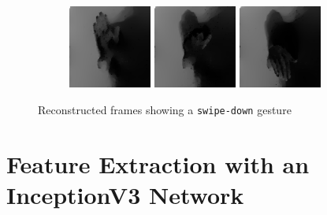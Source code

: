 \begin{figure}[h]
  \centering
  \begin{subfigure}{\textwidth}
    \hspace*{\fill}
    \includegraphics[width=0.3\textwidth]{figures/methods/reconstructed-1}
    \hspace*{\fill}
    \includegraphics[width=0.3\textwidth]{figures/methods/reconstructed-2}
    \hspace*{\fill}
    \includegraphics[width=0.3\textwidth]{figures/methods/reconstructed-3}
    \hspace*{\fill}
  \end{subfigure}
  \caption{Reconstructed frames showing a \texttt{swipe-down} gesture}
  \label{fig:reconstructed}
\end{figure}

\section{Feature Extraction with an InceptionV3 Network}
\label{sec:inceptionv3}

